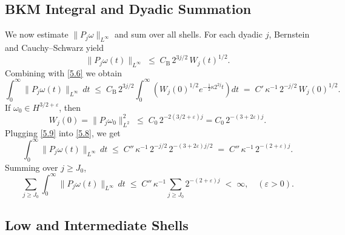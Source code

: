 \documentclass[11pt]{article}
\begin{document}
\subsection{BKM Integral and Dyadic Summation}
We now estimate $\|P_j \omega\|_{L^\infty}$ and sum over all shells. For each dyadic $j$, Bernstein and Cauchy--Schwarz yield
\begin{equation}
\|P_j \omega(t)\|_{L^\infty} \;\leq\; C_{\mathrm{B}} \, 2^{3j/2} \, W_j(t)^{1/2}. \tag{5.7}
\end{equation}
Combining with \eqref{5.6} we obtain
\begin{equation}
\int_0^\infty \|P_j \omega(t)\|_{L^\infty} \, dt 
\;\leq\; C_{\mathrm{B}} \, 2^{3j/2} \int_0^\infty \left( W_j(0)^{1/2} e^{-\frac{1}{2} \kappa 2^{2j} t} \right) dt 
\;=\; C' \, \kappa^{-1} \, 2^{-j/2} \, W_j(0)^{1/2}. \tag{5.8}
\end{equation}
If $\omega_0 \in H^{3/2+\varepsilon}$, then 
\begin{equation}
W_j(0) = \|P_j \omega_0\|_{L^2}^2 \;\leq\; C_0 \, 2^{-2(3/2+\varepsilon) j} = C_0 \, 2^{-(3+2\varepsilon) j}. \tag{5.9}
\end{equation}
Plugging \eqref{5.9} into \eqref{5.8}, we get
\begin{equation}
\int_0^\infty \|P_j \omega(t)\|_{L^\infty} \, dt \; \leq \; C'' \, \kappa^{-1} \, 2^{-j/2} \, 2^{-(3+2\varepsilon)j/2} \;=\; C'' \, \kappa^{-1} \, 2^{-(2+\varepsilon) j}. \tag{5.10}
\end{equation}
Summing over $j \geq J_0$,
\begin{equation}
\sum_{j \geq J_0} \int_0^\infty \|P_j \omega(t)\|_{L^\infty} \, dt \;\leq\; C'' \, \kappa^{-1} \sum_{j \geq J_0} 2^{-(2+\varepsilon) j} \;<\; \infty, \quad (\varepsilon>0). \tag{5.11}
\end{equation}

\subsection{Low and Intermediate Shells}
\end{document}
